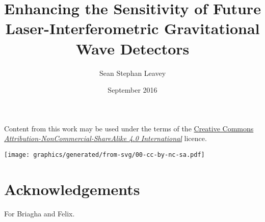 \documentclass[twoside,nogutter]{glasgowthesis}
\begin{document}

\title{Enhancing the Sensitivity of Future Laser-Interferometric Gravitational Wave Detectors}
\author{Sean Stephan Leavey}
\date{September 2016}

\maketitle

\cleardoublepage


 

\newpage




\newpage
{}
\vspace*{8in}
\noindent Content from this work may be used under the terms of the \href{https://creativecommons.org/licenses/by-nc-sa/4.0/}{Creative Commons \emph{Attribution-NonCommercial-ShareAlike 4.0 International}} licence.
\begin{center}
  \texttt{[image: graphics/generated/from-svg/00-cc-by-nc-sa.pdf]}
\end{center}

\newpage
\renewcommand{\contentsname}{Table of contents}
\tableofcontents
{}

\listoftables
{}

\listoffigures
{}

\cleardoublepage
\section*{\label{c:intro:credits}Acknowledgements}


\cleardoublepage
{}
\chaptermark{}
\begin{preface}
\begin{flushright} For Briagha and Felix.\end{flushright}
\end{preface}
\end{document}
